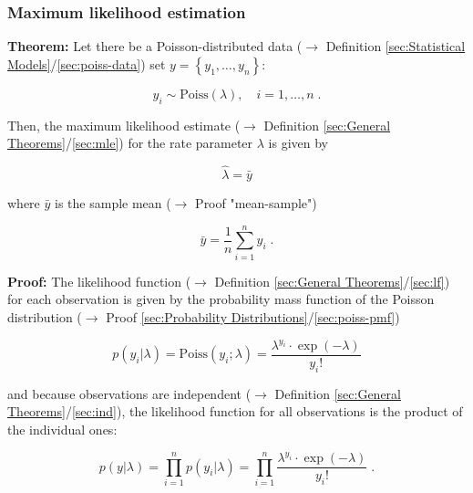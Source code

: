 \documentclass[a4paper,12pt,twoside]{book}
\begin{document}
\subsubsection[\textbf{Maximum likelihood estimation}]{Maximum likelihood estimation} \label{sec:poiss-mle}
\setcounter{equation}{0}

\textbf{Theorem:} Let there be a Poisson-distributed data ($\rightarrow$ Definition \ref{sec:Statistical Models}/\ref{sec:poiss-data}) set $y = \left\lbrace y_1, \ldots, y_n \right\rbrace$:

\begin{equation} \label{eq:poiss-mle-Poiss}
y_i \sim \mathrm{Poiss}(\lambda), \quad i = 1, \ldots, n \; .
\end{equation}

Then, the maximum likelihood estimate ($\rightarrow$ Definition \ref{sec:General Theorems}/\ref{sec:mle}) for the rate parameter $\lambda$ is given by

\begin{equation} \label{eq:poiss-mle-Poiss-MLE}
\hat{\lambda} = \bar{y}
\end{equation}

where $\bar{y}$ is the sample mean ($\rightarrow$ Proof "mean-sample")

\begin{equation} \label{eq:poiss-mle-y-mean}
\bar{y} = \frac{1}{n} \sum_{i=1}^n y_i \; .
\end{equation}


\vspace{1em}
\textbf{Proof:} The likelihood function ($\rightarrow$ Definition \ref{sec:General Theorems}/\ref{sec:lf}) for each observation is given by the probability mass function of the Poisson distribution ($\rightarrow$ Proof \ref{sec:Probability Distributions}/\ref{sec:poiss-pmf})

\begin{equation} \label{eq:poiss-mle-Poiss-yi}
p(y_i|\lambda) = \mathrm{Poiss}(y_i; \lambda) = \frac{\lambda^{y_i} \cdot \exp(-\lambda)}{y_i !}
\end{equation}

and because observations are independent ($\rightarrow$ Definition \ref{sec:General Theorems}/\ref{sec:ind}), the likelihood function for all observations is the product of the individual ones:

\begin{equation} \label{eq:poiss-mle-Poiss-LF}
p(y|\lambda) = \prod_{i=1}^n p(y_i|\lambda) = \prod_{i=1}^n \frac{\lambda^{y_i} \cdot \exp(-\lambda)}{y_i !} \; .
\end{equation}
\end{document}
